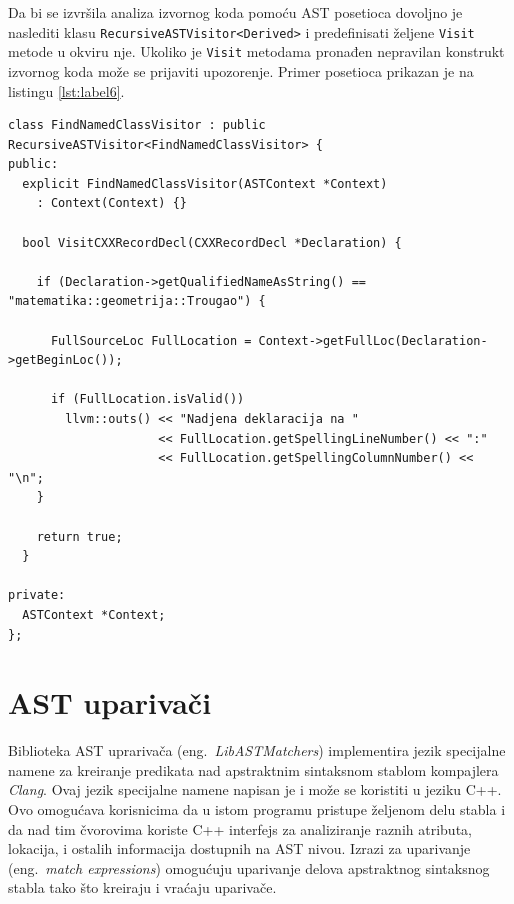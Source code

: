 \documentclass[12pt,oneside]{memoir}
\begin{document}
\par
Da bi se izvršila analiza izvornog koda pomoću AST posetioca dovoljno je naslediti klasu 
 \texttt{RecursiveASTVisitor<Derived>} i predefinisati željene \texttt{Visit} metode u okviru nje. Ukoliko je \texttt{Visit} metodama pronađen nepravilan konstrukt izvornog koda mo\v{z}e se prijaviti upozorenje. Primer posetioca prikazan je na listingu \ref{lst:label6}.

\begin{lstlisting}[style=customc,  caption={Primer posetioaca koji pose\'{c}uje sve strukture, unije i klase i ispisuje lokaciju onih \v{c}iji naziv je \texttt{matematika::geometrija::Trougao}.},label=lst:label6]
class FindNamedClassVisitor : public RecursiveASTVisitor<FindNamedClassVisitor> {
public:
  explicit FindNamedClassVisitor(ASTContext *Context)
    : Context(Context) {}

  bool VisitCXXRecordDecl(CXXRecordDecl *Declaration) {

    if (Declaration->getQualifiedNameAsString() == "matematika::geometrija::Trougao") {

      FullSourceLoc FullLocation = Context->getFullLoc(Declaration->getBeginLoc());

      if (FullLocation.isValid())
        llvm::outs() << "Nadjena deklaracija na "
                     << FullLocation.getSpellingLineNumber() << ":"
                     << FullLocation.getSpellingColumnNumber() << "\n";
    }

    return true;
  }

private:
  ASTContext *Context;
};
\end{lstlisting}


\section{AST upariva\v{c}i}
\label{sec:matchers}

Biblioteka AST uprariva\v{c}a (eng.~\textit{LibASTMatchers}) implementira jezik specijalne namene za kreiranje predikata nad apstraktnim sintaksnom stablom kompajlera \textit{Clang}. Ovaj jezik specijalne namene napisan je i može se koristiti u jeziku C++. Ovo omogućava korisnicima da u istom programu pristupe željenom delu stabla i da nad tim čvorovima koriste C++ interfejs za analiziranje raznih atributa, lokacija, i ostalih informacija dostupnih na AST nivou. Izrazi za uparivanje (eng.~\textit{match expressions}) omogu\'{c}uju uparivanje delova apstraktnog sintaksnog stabla tako \v{s}to kreiraju i vra\'{c}aju upariva\v{c}e.
\end{document}
